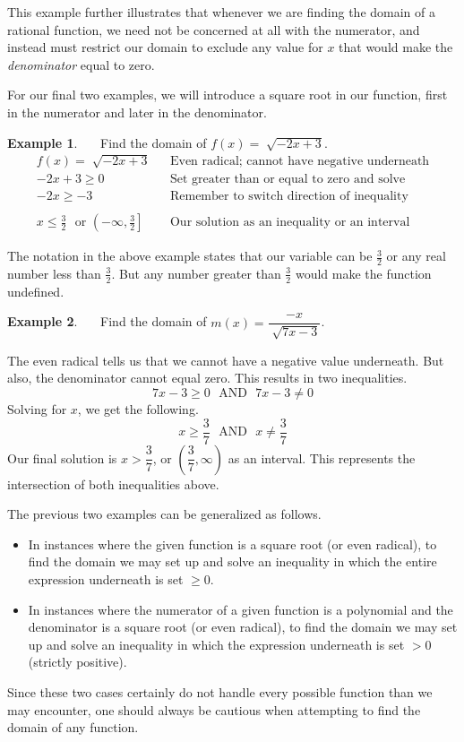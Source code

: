 \documentclass[12pt]{book}
\theoremstyle{definition}
\newtheorem{example}{Example}
\newcommand{\tmop}[1]{\ensuremath{\operatorname{#1}}}
\begin{document}
This example further illustrates that whenever we are finding the domain of a rational function, we need not be concerned at all with the numerator, and instead must restrict our domain to exclude any value for $x$ that would make the {\it denominator} equal to zero.\par
For our final two examples, we will introduce a square root in our function, first in the numerator and later in the denominator.
\begin{example}~~~Find the domain of $f (x) = \sqrt[]{-2 x + 3}$.
  \begin{eqnarray*}
    f (x) = \sqrt[]{-2 x + 3} &  & \tmop{Even~radical;~cannot~have~negative~underneath}\\
		-2 x + 3 \geq 0 &  & \tmop{Set~greater~than~or~equal~to~zero~and~solve}\\
    -2 x \geq -3 &  & \tmop{Remember~to~switch~direction~of~inequality}\\
		& &\\
    x \leq \frac{3}{2} \text{~~or~} \left(-\infty,\frac{3}{2}\right]&  & \tmop{Our~solution~as~an~inequality~or~an~interval}
  \end{eqnarray*}
\end{example}
The notation in the above example states that our variable can be $\frac{3}{2}$ or any real number less than $\frac{3}{2}$. But any number greater
than $\frac{3}{2}$ would make the function undefined.
\begin{example}~~~Find the domain of $m (x) = \dfrac{-x}{\sqrt[]{7x-3}}$.\par
  The even radical tells us that we cannot have a negative value underneath.  But also, the denominator cannot equal zero.  This results in two inequalities.
		$$7x - 3 \geq  0 \text{~~AND~~} 7x-3 \neq 0$$
Solving for $x$, we get the following.
$$	x \geq \frac{3}{7} \text{~~AND~~} x \neq \frac{3}{7}$$
Our final solution is $x > \dfrac{3}{7}$, or $\left(\dfrac{3}{7},\infty\right)$ as an interval.  This represents the intersection of both inequalities above.
\end{example}
The previous two examples can be generalized as follows.
\begin{itemize}
	\item In instances where the given function is a square root (or even radical), to find the domain we may set up and solve an inequality in which the entire expression underneath is set $\geq 0$.
	\item In instances where the numerator of a given function is a polynomial and the denominator is a square root (or even radical), to find the domain we may set up and solve an inequality in which the expression underneath is set $> 0$ (strictly positive).
\end{itemize}
Since these two cases certainly do not handle every possible function than we may encounter, one should always be cautious when attempting to find the domain of any function.
\end{document}
